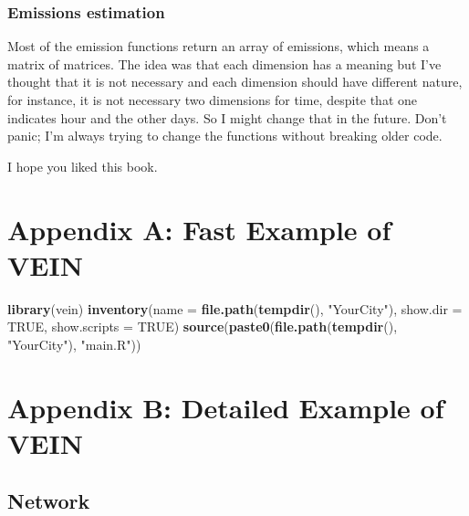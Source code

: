 \documentclass[12pt,graybox,envcountchap,sectrefs]{krantz}
\makeatletter
\newenvironment{Shaded}{\begin{snugshade}}{\end{snugshade}}
\newcommand{\KeywordTok}[1]{\textcolor[rgb]{0.13,0.29,0.53}{\textbf{#1}}}
\newcommand{\DataTypeTok}[1]{\textcolor[rgb]{0.13,0.29,0.53}{#1}}
\newcommand{\StringTok}[1]{\textcolor[rgb]{0.31,0.60,0.02}{#1}}
\newcommand{\OtherTok}[1]{\textcolor[rgb]{0.56,0.35,0.01}{#1}}
\newcommand{\NormalTok}[1]{#1}
\newenvironment{kframe}{%
\medskip{}
\setlength{\fboxsep}{.8em}
 \def\at@end@of@kframe{}%
 \ifinner\ifhmode%
  \def\at@end@of@kframe{\end{minipage}}%
  \begin{minipage}{\columnwidth}%
 \fi\fi%
 \def\FrameCommand##1{\hskip\@totalleftmargin \hskip-\fboxsep
 \colorbox{shadecolor}{##1}\hskip-\fboxsep
     \hskip-\linewidth \hskip-\@totalleftmargin \hskip\columnwidth}%
 \MakeFramed {\advance\hsize-\width
   \@totalleftmargin\z@ \linewidth\hsize
   \@setminipage}}%
 {\par\unskip\endMakeFramed%
 \at@end@of@kframe}
\renewenvironment{Shaded}{\begin{kframe}}{\end{kframe}}
\theoremstyle{definition}
\theoremstyle{definition}
\theoremstyle{definition}
\theoremstyle{remark}
\makeatother
\begin{document}
\subsection{Emissions estimation}\label{emissions-estimation}

Most of the emission functions return an array of emissions, which means
a matrix of matrices. The idea was that each dimension has a meaning but
I've thought that it is not necessary and each dimension should have
different nature, for instance, it is not necessary two dimensions for
time, despite that one indicates hour and the other days. So I might
change that in the future. Don't panic; I'm always trying to change the
functions without breaking older code.

I hope you liked this book.

\appendix {}


\chapter*{Appendix A: Fast Example of
VEIN}\label{appendix-a-fast-example-of-vein}


\begin{Shaded}
\begin{Highlighting}[]
\KeywordTok{library}\NormalTok{(vein)}
\KeywordTok{inventory}\NormalTok{(}\DataTypeTok{name =} \KeywordTok{file.path}\NormalTok{(}\KeywordTok{tempdir}\NormalTok{(), }\StringTok{"YourCity"}\NormalTok{),}
          \DataTypeTok{show.dir =} \OtherTok{TRUE}\NormalTok{,}
          \DataTypeTok{show.scripts =} \OtherTok{TRUE}\NormalTok{)}
\KeywordTok{source}\NormalTok{(}\KeywordTok{paste0}\NormalTok{(}\KeywordTok{file.path}\NormalTok{(}\KeywordTok{tempdir}\NormalTok{(), }\StringTok{"YourCity"}\NormalTok{), }\StringTok{"main.R"}\NormalTok{))}
\end{Highlighting}
\end{Shaded}

\chapter*{Appendix B: Detailed Example of
VEIN}\label{appendix-b-detailed-example-of-vein}


\section{Network}\label{network-1}
\end{document}
